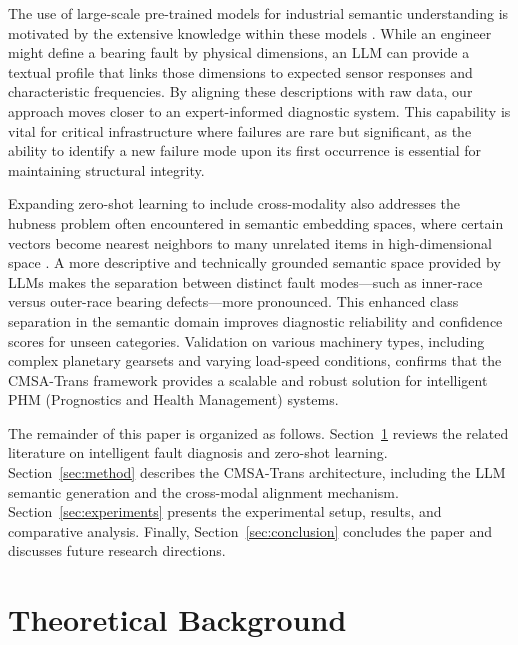 \documentclass[journal]{IEEEtran}
\begin{document}
The use of large-scale pre-trained models for industrial semantic understanding is motivated by the extensive knowledge within these models \cite{zhao2023brain}. While an engineer might define a bearing fault by physical dimensions, an LLM can provide a textual profile that links those dimensions to expected sensor responses and characteristic frequencies. By aligning these descriptions with raw data, our approach moves closer to an expert-informed diagnostic system. This capability is vital for critical infrastructure where failures are rare but significant, as the ability to identify a new failure mode upon its first occurrence is essential for maintaining structural integrity.

Expanding zero-shot learning to include cross-modality also addresses the hubness problem often encountered in semantic embedding spaces, where certain vectors become nearest neighbors to many unrelated items in high-dimensional space \cite{radovanovic2010hubs}. A more descriptive and technically grounded semantic space provided by LLMs makes the separation between distinct fault modes---such as inner-race versus outer-race bearing defects---more pronounced. This enhanced class separation in the semantic domain improves diagnostic reliability and confidence scores for unseen categories. Validation on various machinery types, including complex planetary gearsets and varying load-speed conditions, confirms that the CMSA-Trans framework provides a scalable and robust solution for intelligent PHM (Prognostics and Health Management) systems.

The remainder of this paper is organized as follows. Section~\ref{sec:background} reviews the related literature on intelligent fault diagnosis and zero-shot learning. Section~\ref{sec:method} describes the CMSA-Trans architecture, including the LLM semantic generation and the cross-modal alignment mechanism. Section~\ref{sec:experiments} presents the experimental setup, results, and comparative analysis. Finally, Section~\ref{sec:conclusion} concludes the paper and discusses future research directions.

\section{Theoretical Background}
\label{sec:background}
\end{document}
